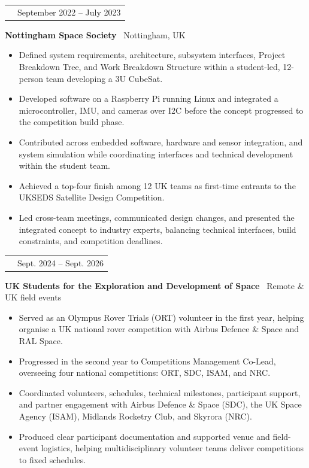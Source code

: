 \documentclass[10pt,a4paper]{article}
\makeatletter
\newcommand{\RoleSize}{10.3pt}
\newcommand{\CompanySize}{9.6pt}
\newcommand{\DurationSize}{9pt}
\newcommand{\BodySize}{9.2pt}
\newcommand{\RoleLineSize}{11.5pt}
\newcommand{\CompanyLineSize}{10.8pt}
\newcommand{\DurationLineSize}{9pt}
\newcommand{\BodyLineSize}{11pt}
\newcommand{\EntryBefore}{0pt}
\newcommand{\RoleToCompany}{-5pt}
\newcommand{\CompanyToBullets}{3pt}
\newcommand{\EntryAfter}{6pt}
\newcommand{\BulletSpacing}{2pt}
\newcommand{\BulletBefore}{0pt}
\newcommand{\BulletIndent}{1.25em}
\newcommand{\DurationWidth}{4.5cm}
\newcommand{\CVEntry}[5]{

    \vspace{\EntryBefore}


    \noindent
    \begin{tabularx}{\textwidth}{
        @{}
        >{\raggedright\arraybackslash}X
        >{\raggedleft\arraybackslash}p{\DurationWidth}
        @{}
    }

        {\fontsize{\RoleSize}{\RoleLineSize}
        \selectfont
        \textbf{\textcolor{CVBlack}{#1}}}
        &
        {\fontsize{\DurationSize}{\DurationLineSize}
        \selectfont
        \textcolor{CVGray}{#4}}

    \end{tabularx}

    \vspace{\RoleToCompany}


    \noindent
    {\fontsize{\CompanySize}{\CompanyLineSize}
    \selectfont
    \textbf{\textcolor{CVDarkGray}{#2}}
    \textcolor{CVGray}{\textbar\ #3}}

    \vspace{\CompanyToBullets}


    \begin{itemize}[
        leftmargin=\BulletIndent,
        itemsep=\BulletSpacing,
        topsep=\BulletBefore,
        parsep=0pt,
        partopsep=0pt
    ]
        #5
    \end{itemize}

    \vspace{\EntryAfter}
}
\newcommand{\CVBullet}[1]{
    \item
    {\fontsize{\BodySize}{\BodyLineSize}
    \selectfont
    \textcolor{CVDarkGray}{#1}}
}
\makeatother
\begin{document}
\clearpage

\CVEntry
{IDET-Sat -- Systems Engineer}
{Nottingham Space Society}
{Nottingham, UK}
{September 2022 -- July 2023}
{
    \CVBullet{Defined system requirements, architecture, subsystem interfaces, Project Breakdown Tree, and Work Breakdown Structure within a student-led, 12-person team developing a 3U CubeSat.}

    \CVBullet{Developed software on a Raspberry Pi running Linux and integrated a microcontroller, IMU, and cameras over I2C before the concept progressed to the competition build phase.}

    \CVBullet{Contributed across embedded software, hardware and sensor integration, and system simulation while coordinating interfaces and technical development within the student team.}

    \CVBullet{Achieved a top-four finish among 12 UK teams as first-time entrants to the UKSEDS Satellite Design Competition.}

    \CVBullet{Led cross-team meetings, communicated design changes, and presented the integrated concept to industry experts, balancing technical interfaces, build constraints, and competition deadlines.}
}

\CVEntry
{UKSEDS Volunteer}
{UK Students for the Exploration and Development of Space}
{Remote \& UK field events}
{Sept. 2024 -- Sept. 2026}
{
    \CVBullet{Served as an Olympus Rover Trials (ORT) volunteer in the first year, helping organise a UK national rover competition with Airbus Defence \& Space and RAL Space.}

    \CVBullet{Progressed in the second year to Competitions Management Co-Lead, overseeing four national competitions: ORT, SDC, ISAM, and NRC.}

    \CVBullet{Coordinated volunteers, schedules, technical milestones, participant support, and partner engagement with Airbus Defence \& Space (SDC), the UK Space Agency (ISAM), Midlands Rocketry Club, and Skyrora (NRC).}

    \CVBullet{Produced clear participant documentation and supported venue and field-event logistics, helping multidisciplinary volunteer teams deliver competitions to fixed schedules.}
}

\end{document}

